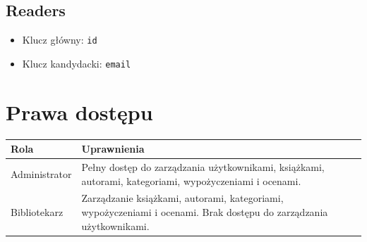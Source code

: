 \documentclass{article}
\begin{document}
\subsection*{Readers}
\begin{itemize}
    \item Klucz główny: \texttt{id}
    \item Klucz kandydacki: \texttt{email}
\end{itemize}

\section*{Prawa dostępu}
\begin{longtable}{|l|p{10cm}|}
\hline
\textbf{Rola} & \textbf{Uprawnienia} \\
\hline
Administrator & Pełny dostęp do zarządzania użytkownikami, książkami, autorami, kategoriami, wypożyczeniami i ocenami. \\
\hline
Bibliotekarz & Zarządzanie książkami, autorami, kategoriami, wypożyczeniami i ocenami. Brak dostępu do zarządzania użytkownikami. \\
\hline
\end{longtable}
\end{document}
